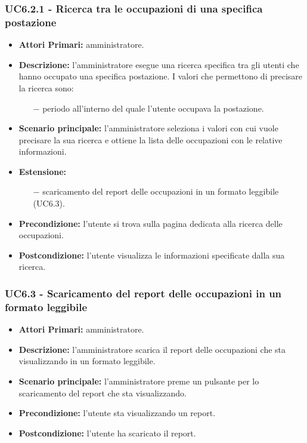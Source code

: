 \subsubsection{ UC6.2.1 - Ricerca tra le occupazioni di una specifica postazione}
\begin{itemize}
	\item\textbf{Attori Primari:} 
	amministratore.
	\item\textbf{Descrizione:} 
	l'amministratore esegue una ricerca specifica tra gli utenti che hanno occupato una specifica postazione.
	I valori che permettono di precisare la ricerca sono:
	\begin{itemize}
		\item[$-$] periodo all'interno del quale l'utente occupava la postazione.
	\end{itemize}
	\item\textbf{Scenario principale:} 
	l'amministratore seleziona i valori con cui vuole precisare la sua ricerca e ottiene la lista delle occupazioni con le relative informazioni.
	\item\textbf{Estensione:}
	\begin{itemize}
		\item[$-$] scaricamento del report delle occupazioni in un formato leggibile (UC6.3).
	\end{itemize}
	\item\textbf{Precondizione:} 
	l'utente si trova sulla pagina dedicata alla ricerca delle occupazioni.
	\item\textbf{Postcondizione:}
	l'utente visualizza le informazioni specificate dalla sua ricerca.
\end{itemize}

\subsubsection{ UC6.3 - Scaricamento del report delle occupazioni in un formato leggibile}
\begin{itemize}
	\item\textbf{Attori Primari:} 
	amministratore.
	\item\textbf{Descrizione:} 
	l'amministratore scarica il report delle occupazioni che sta visualizzando in un formato leggibile.
	\item\textbf{Scenario principale:} 
	l'amministratore preme un pulsante per lo scaricamento del report che sta visualizzando.
	\item\textbf{Precondizione:} 
	l'utente sta visualizzando un report.
	\item\textbf{Postcondizione:}
	l'utente ha scaricato il report.
\end{itemize}

